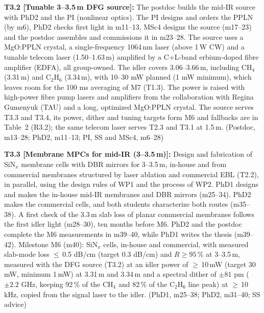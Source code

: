\documentclass[a4paper,12pt]{article}
\newcommand{\jc}[1]{\textcolor{dkrust}{#1}} %
\newcommand{\nc}[1]{\textcolor{dkleaf}{#1}} %
\newcommand{\rc}[1]{\textcolor{dkcyan}{#1}} %
\begin{document}
\textbf{T3.2 [Tunable 3--3.5\,\textmu{}m DFG source]:} \jc{The postdoc builds the mid-IR source with PhD2 and the PI (nonlinear optics). The PI designs and orders the PPLN (by m6), PhD2 checks first light in m11--13, MSc4 designs the source (m17--23) and the postdoc assembles and commissions it in m23--28. The source uses a MgO:PPLN crystal, a single-frequency 1064\,nm laser (above 1\,W CW) and a tunable telecom laser (1.50--1.63\,\textmu{}m) amplified by a C+L-band erbium-doped fibre amplifier (EDFA), all group-owned. The idler covers 3.06--3.66\,\textmu{}m, including CH$_4$ (3.31\,\textmu{}m) and C$_2$H$_6$ (3.34\,\textmu{}m), with 10--30 mW planned (1 mW minimum), which leaves room for the 100 ms averaging of M7 (T1.3). The power is raised with high-power fibre pump lasers and amplifiers from the collaboration with Regina Gumenyuk (TAU) and a long, optimized MgO:PPLN crystal. The source serves T3.3 and T3.4, its power, dither and tuning targets form M6 and fallbacks are in Table~2 (R3.2); the same telecom laser serves T2.3 and T3.1 at 1.5\,\textmu{}m.} (Postdoc, m13--28; PhD2, m11--13; PI, SS and MSc4, m6--28)

\textbf{T3.3 [Membrane MPCs for mid-IR (3--3.5\,\textmu{}m)]:} Design and fabrication of SiN$_x$ membrane cells with DBR mirrors for 3--3.5\,\textmu{}m, in-house and from commercial membranes structured by laser ablation and commercial EBL (T2.2), in parallel, using the design rules of WP1 and the process of WP2. PhD1 designs and makes the in-house mid-IR membranes and DBR mirrors (\nc{m25--34}). PhD2 makes the commercial cells, and both students characterize both routes (\nc{m35--38}). \nc{A first check of the 3.3\,\textmu{}m slab loss of planar commercial membranes follows the first idler light (m28--30), ten months before M6. PhD2 and the postdoc complete the M6 measurements in m39--40, while PhD1 writes the thesis (m39--42).} Milestone M6 (m40): SiN$_x$ cells, in-house and commercial, with measured slab-mode loss $\leq$\,0.5 dB/cm (target 0.3 dB/cm) and $R\geq95\,\%$ at 3--3.5\,\textmu{}m, measured with the DFG source (T3.2) at an idler power of $\geq$\,\jc{10\,mW (target 30\,mW, minimum 1\,mW)} at 3.31\,\textmu{}m \rc{and 3.34\,\textmu{}m} and a spectral dither of \jc{$\pm81$ pm ($\pm2.2$ GHz, keeping 92\,\% of the CH$_4$ and 82\,\% of the C$_2$H$_6$ line peak) at $\geq$\,10\,kHz, copied from the signal laser to the idler}. (PhD1, \nc{m25--38}; PhD2, m31--40; SS advice)
\end{document}
